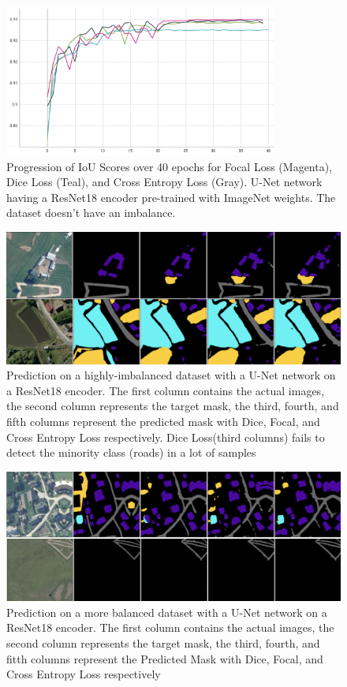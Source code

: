 \documentclass[sigconf, nonacm]{acmart}
\begin{document}
\begin{figure}[h]
    \includegraphics[width=9cm, height=5cm]{images/encoders/encoders_fscore.png}
    \caption{Progression of IoU Scores over 40 epochs for Focal Loss (Magenta), Dice Loss (Teal), and Cross Entropy Loss (Gray). U-Net network having a ResNet18 encoder pre-trained with ImageNet weights. The dataset doesn't have an imbalance. }
\end{figure}



\begin{figure}
    \centering
    \includegraphics[width=\textwidth]{images/no-roads-losses/2-images.png}
    \caption{Prediction on a highly-imbalanced dataset with a U-Net network on a ResNet18 encoder. The first column contains the actual images, the second column represents the target mask, the third, fourth, and fifth columns represent the predicted mask with Dice, Focal, and Cross Entropy Loss respectively. Dice Loss(third columns) fails to detect the minority class (roads) in a lot of samples}
\end{figure}

\begin{figure}[h]
    \centering
    \includegraphics[width=\textwidth]{images/roads-losses/with-roads.png}
    \caption{Prediction on a more balanced dataset with a U-Net network on a ResNet18 encoder. The first column contains the actual images, the second column represents the target mask, the third, fourth, and fitth columns represent the Predicted Mask with Dice, Focal, and Cross Entropy Loss respectively}
\end{figure}
\end{document}
